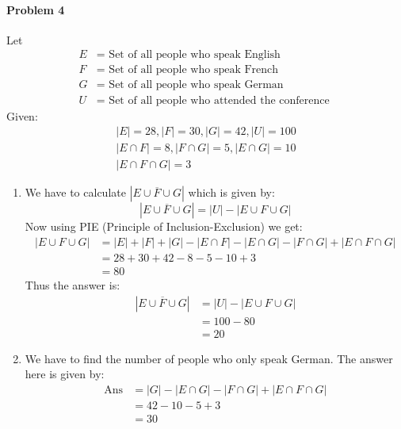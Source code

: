 \documentclass[12pt]{scrartcl}
\begin{document}
\paragraph*{Problem 4} 
Let
\begin{align*}
   E &= \text{ Set of all people who speak English }  \\
   F &= \text{ Set of all people who speak French } \\ 
   G &= \text{ Set of all people who speak German } \\
   U &= \text{ Set of all people who attended the conference }
\end{align*}
Given:
\begin{gather*}
    |E| = 28, |F| = 30, |G| = 42, |U| = 100 \\  
    |E \cap F| = 8, |F \cap G| = 5, |E \cap G| = 10 \\
    |E \cap F \cap G| = 3
\end{gather*}

\begin{enumerate}
    \item We have to calculate $|\overline{E \cup F \cup G}|$ which is given by:
    \[
        |\overline{E \cup F \cup G}| = |U| - |E \cup F \cup G|
    \]
    Now using PIE (Principle of Inclusion-Exclusion) we get:
    \begin{align*}
        |E \cup F \cup G| &= |E| + |F| + |G| - |E \cap F| - |E \cap G| - |F \cap G| + |E \cap F \cap G| \\
                          &= 28 + 30 + 42 - 8 - 5 - 10 + 3 \\
                          &= 80
    \end{align*}
    Thus the answer is:
    \begin{align*}
        |\overline{E \cup F \cup G}| &= |U| - |E \cup F \cup G| \\
                                     &= 100 - 80 \\
                                     &= 20
    \end{align*}
    \item We have to find the number of people who only speak German. The answer here is given by: 
    \begin{align*}
        \text{Ans} &= |G| - |E \cap G| - |F \cap G| + |E \cap F \cap G| \\
                   &= 42 - 10 - 5 + 3 \\ 
                   &= 30
    \end{align*}    
\end{enumerate}
\end{document}
